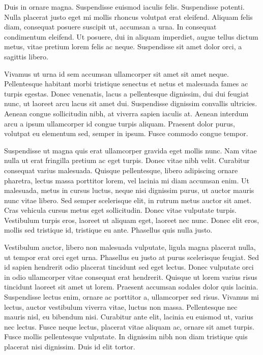 \documentclass[a4paper]{article}
\begin{document}
Duis in ornare magna. Suspendisse euismod iaculis felis. Suspendisse potenti. Nulla placerat justo eget mi mollis rhoncus volutpat erat eleifend. Aliquam felis diam, consequat posuere suscipit ut, accumsan a urna. In consequat condimentum eleifend. Ut posuere, dui in aliquam imperdiet, augue tellus dictum metus, vitae pretium lorem felis ac neque. Suspendisse sit amet dolor orci, a sagittis libero.

Vivamus ut urna id sem accumsan ullamcorper sit amet sit amet neque. Pellentesque habitant morbi tristique senectus et netus et malesuada fames ac turpis egestas. Donec venenatis, lacus a pellentesque dignissim, dui dui feugiat nunc, ut laoreet arcu lacus sit amet dui. Suspendisse dignissim convallis ultricies. Aenean congue sollicitudin nibh, at viverra sapien iaculis at. Aenean interdum arcu a ipsum ullamcorper id congue turpis aliquam. Praesent dolor purus, volutpat eu elementum sed, semper in ipsum. Fusce commodo congue tempor.

Suspendisse ut magna quis erat ullamcorper gravida eget mollis nunc. Nam vitae nulla ut erat fringilla pretium ac eget turpis. Donec vitae nibh velit. Curabitur consequat varius malesuada. Quisque pellentesque, libero adipiscing ornare pharetra, lectus massa porttitor lorem, vel lacinia mi diam accumsan enim. Ut malesuada, metus in cursus luctus, neque nisi dignissim purus, ut auctor mauris nunc vitae libero. Sed semper scelerisque elit, in rutrum metus auctor sit amet. Cras vehicula cursus metus eget sollicitudin. Donec vitae vulputate turpis. Vestibulum turpis eros, laoreet ut aliquam eget, laoreet nec nunc. Donec elit eros, mollis sed tristique id, tristique eu ante. Phasellus quis nulla justo.

Vestibulum auctor, libero non malesuada vulputate, ligula magna placerat nulla, ut tempor erat orci eget urna. Phasellus eu justo at purus scelerisque feugiat. Sed id sapien hendrerit odio placerat tincidunt sed eget lectus. Donec vulputate orci in odio ullamcorper vitae consequat erat hendrerit. Quisque ut lorem varius risus tincidunt laoreet sit amet ut lorem. Praesent accumsan sodales dolor quis lacinia. Suspendisse lectus enim, ornare ac porttitor a, ullamcorper sed risus. Vivamus mi lectus, auctor vestibulum viverra vitae, luctus non massa. Pellentesque nec mauris nisl, eu bibendum nisi. Curabitur ante elit, lacinia eu euismod ut, varius nec lectus. Fusce neque lectus, placerat vitae aliquam ac, ornare sit amet turpis. Fusce mollis pellentesque vulputate. In dignissim nibh non diam tristique quis placerat nisi dignissim. Duis id elit tortor.
\end{document}

